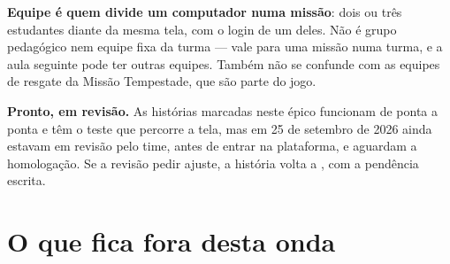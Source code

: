 \textbf{Equipe é quem divide um computador numa missão}: dois ou três
estudantes diante da mesma tela, com o login de um deles. Não é grupo
pedagógico nem equipe fixa da turma --- vale para uma missão numa turma, e a
aula seguinte pode ter outras equipes. Também não se confunde com as equipes de
resgate da Missão Tempestade, que são parte do jogo.

\begin{nota}
\textbf{Pronto, em revisão.} As histórias marcadas \pronto{} neste épico
funcionam de ponta a ponta e têm o teste que percorre a tela, mas em 25 de
setembro de 2026 ainda estavam em revisão pelo time, antes de entrar na
plataforma, e aguardam a homologação. Se a revisão pedir ajuste, a história
volta a \parcial{}, com a pendência escrita.
\end{nota}

\section{O que fica fora desta onda}

